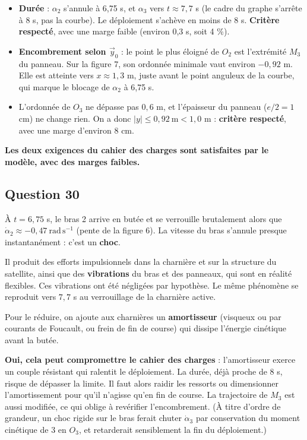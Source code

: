 \documentclass[11pt,a4paper]{article}
\providecommand{\tightlist}{\setlength{\itemsep}{0pt}\setlength{\parskip}{0pt}}
\begin{document}
\begin{itemize}
\tightlist
\item
  \textbf{Durée} : \(\alpha_2\) s'annule à 6,75 s, et \(\alpha_3\) vers \(t\approx7{,}7\) s (le cadre du graphe s'arrête à 8 s, pas la courbe). Le déploiement s'achève en moins de 8 s. \textbf{Critère respecté}, avec une marge faible (environ 0,3 s, soit 4 \%).
\item
  \textbf{Encombrement selon \(\vec y_0\)} : le point le plus éloigné de \(O_2\) est l'extrémité \(M_3\) du panneau. Sur la figure 7, son ordonnée minimale vaut environ \(-0{,}92\) m. Elle est atteinte vers \(x\approx1{,}3\) m, juste avant le point anguleux de la courbe, qui marque le blocage de \(\alpha_2\) à 6,75 s.
\item
  L'ordonnée de \(O_3\) ne dépasse pas \(0{,}6\) m, et l'épaisseur du panneau (\(e/2=1\) cm) ne change rien. On a donc \(|y|\le0{,}92\ \mathrm m<1{,}0\) m : \textbf{critère respecté}, avec une marge d'environ 8 cm.
\end{itemize}

\textbf{Les deux exigences du cahier des charges sont satisfaites par le modèle, avec des marges faibles.}

\hypertarget{question-30}{%
\subsection{Question 30}\label{question-30}}

À \(t=6{,}75\) s, le bras 2 arrive en butée et se verrouille brutalement alors que \(\dot\alpha_2\approx-0{,}47\ \mathrm{rad\,s^{-1}}\) (pente de la figure 6). La vitesse du bras s'annule presque instantanément : c'est un \textbf{choc}.

Il produit des efforts impulsionnels dans la charnière et sur la structure du satellite, ainsi que des \textbf{vibrations} du bras et des panneaux, qui sont en réalité flexibles. Ces vibrations ont été négligées par hypothèse. Le même phénomène se reproduit vers \(7{,}7\) s au verrouillage de la charnière active.

Pour le réduire, on ajoute aux charnières un \textbf{amortisseur} (visqueux ou par courants de Foucault, ou frein de fin de course) qui dissipe l'énergie cinétique avant la butée.

\textbf{Oui, cela peut compromettre le cahier des charges} : l'amortisseur exerce un couple résistant qui ralentit le déploiement. La durée, déjà proche de 8 s, risque de dépasser la limite. Il faut alors raidir les ressorts ou dimensionner l'amortissement pour qu'il n'agisse qu'en fin de course. La trajectoire de \(M_3\) est aussi modifiée, ce qui oblige à revérifier l'encombrement. (À titre d'ordre de grandeur, un choc rigide sur le bras ferait chuter \(\dot\alpha_3\) par conservation du moment cinétique de 3 en \(O_3\), et retarderait sensiblement la fin du déploiement.)
\end{document}
